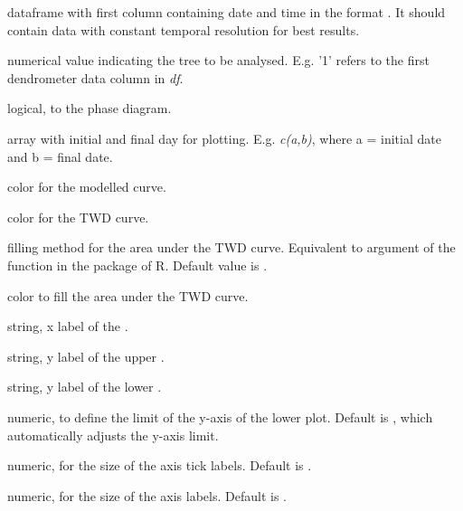 \documentclass[a4paper]{book}
\begin{document}
\begin{Arguments}
\begin{ldescription}
\item[\code{df}] dataframe with first column containing date and time in the format . It should contain data with constant temporal resolution for best results.

\item[\code{TreeNum}] numerical value indicating the tree to be analysed. E.g. '1' refers to the first dendrometer data column in \emph{df}.

\item[\code{outputplot}] logical, to  the phase diagram.

\item[\code{days}] array with initial and final day for plotting. E.g. \emph{c(a,b)}, where a = initial date and b = final date.

\item[\code{linearCol}] color for the modelled curve.

\item[\code{twdCol}] color for the TWD curve.

\item[\code{twdFill}] filling method for the area under the TWD curve. Equivalent to  argument of the  function in the  package of R. Default value is .

\item[\code{twdFillCol}] color to fill the area under the TWD curve.

\item[\code{xlab}] string, x label of the .

\item[\code{ylab1}] string, y label of the upper .

\item[\code{ylab2}] string, y label of the lower .

\item[\code{twdYlim}] numeric, to define the limit of the y-axis of the lower plot. Default is , which automatically adjusts the y-axis limit.

\item[\code{cex.axis}] numeric, for the size of the axis tick labels. Default is .

\item[\code{cex.lab}] numeric, for the size of the axis labels. Default is .


\end{ldescription}
\end{Arguments}
\end{document}
